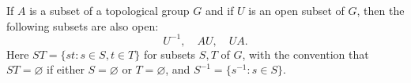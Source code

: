 If $A$ is a subset of a topological group $G$ and if $U$ is an open subset of $G$, then the following subsets are also open:
$$U^{-1}, \quad AU, \quad UA.$$
Here $ST = \{st : s \in S, t \in T\}$ for subsets $S, T$ of $G$, with the convention that $ST = \varnothing$ if either $S = \varnothing$ or $T = \varnothing$, and $S^{-1} = \{s^{-1} : s \in S\}$.
